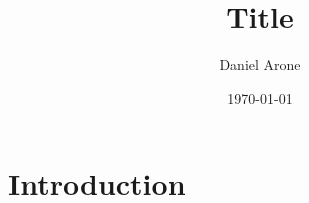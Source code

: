 \documentclass{article} %
\title{Title}
\author{Daniel Arone}
\date{\today}
\begin{document}
\maketitle

\section{Introduction}
\end{document}
